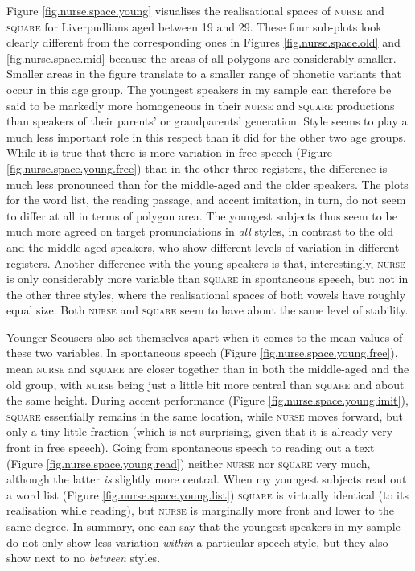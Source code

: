Figure \ref{fig.nurse.space.young} visualises the realisational spaces of \textsc{nurse} and \textsc{square} for Liverpudlians aged between 19 and 29.
These four sub-plots look clearly different from the corresponding ones in Figures \ref{fig.nurse.space.old} and \ref{fig.nurse.space.mid} because the areas of all polygons are considerably smaller.
Smaller areas in the figure translate to a smaller range of phonetic variants that occur in this age group.
The youngest speakers in my sample can therefore be said to be markedly more homogeneous in their \textsc{nurse} and \textsc{square} productions than speakers of their parents' or grandparents' generation.
Style seems to play a much less important role in this respect than it did for the other two age groups.
While it is true that there is more variation in free speech (Figure \ref{fig.nurse.space.young.free}) than in the other three registers, the difference is much less pronounced than for the middle-aged and the older speakers.
The plots for the word list, the reading passage, and accent imitation, in turn, do not seem to differ at all in terms of polygon area.
The youngest subjects thus seem to be much more agreed on target pronunciations in \emph{all} styles, in contrast to the old and the middle-aged speakers, who show different levels of variation in different registers.
Another difference with the young speakers is that, interestingly, \textsc{nurse} is only considerably more variable than \textsc{square} in spontaneous speech, but not in the other three styles, where the realisational spaces of both vowels have roughly equal size.
Both \textsc{nurse} and \textsc{square} seem to have about the same level of stability.

Younger Scousers also set themselves apart when it comes to the mean values of these two variables.
In spontaneous speech (Figure \ref{fig.nurse.space.young.free}), mean \textsc{nurse} and \textsc{square} are closer together than in both the middle-aged and the old group, with \textsc{nurse} being just a little bit more central than \textsc{square} and about the same height.
During accent performance (Figure \ref{fig.nurse.space.young.imit}), \textsc{square} essentially remains in the same location, while \textsc{nurse} moves forward, but only a tiny little fraction (which is not surprising, given that it is already very front in free speech).
Going from spontaneous speech to reading out a text (Figure \ref{fig.nurse.space.young.read}) neither \textsc{nurse} nor \textsc{square}  very much, although the latter \emph{is} slightly more central.
When my youngest subjects read out a word list (Figure \ref{fig.nurse.space.young.list}) \textsc{square} is virtually identical (to its realisation while reading), but \textsc{nurse} is marginally more front and lower to the same degree.
In summary, one can say that the youngest speakers in my sample do not only show less variation \emph{within} a particular speech style, but they also show next to no  \emph{between} styles.

